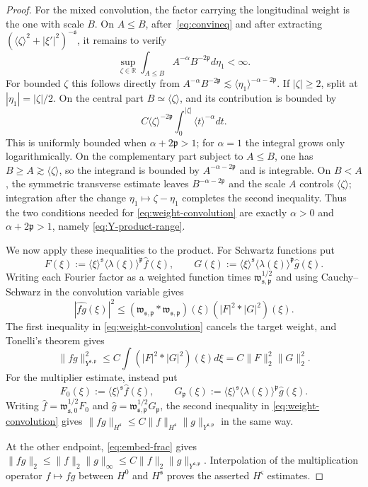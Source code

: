 \documentclass[11pt,reqno]{amsart}
\theoremstyle{plain}
\theoremstyle{definition}
\theoremstyle{remark}
\numberwithin{equation}{section}
\newcommand{\sreg}{\mathfrak s}
\newcommand{\preg}{\mathfrak p}
\newcommand{\Real}{\mathbb R}
\begin{document}
\begin{proof}
For the mixed convolution, the factor carrying the longitudinal weight is
the one with scale $B$.  On $A\le B$, after~\eqref{eq:convineq} and after extracting
$(\langle\zeta\rangle^2+|\xi'|^2)^{-\sreg}$, it remains to verify
\[
 \sup_{\zeta\in\Real}
 \int_{A\le B}A^{-\alpha}B^{-2\preg} d\eta_1<\infty.
\]
For bounded $\zeta$ this follows directly from
$A^{-\alpha}B^{-2\preg}\lesssim
\langle\eta_1\rangle^{-\alpha-2\preg}$.  If $|\zeta|\ge2$, split at
$|\eta_1|=|\zeta|/2$.  On the central part $B\simeq\langle\zeta\rangle$,
and its contribution is bounded by
\[
 C\langle\zeta\rangle^{-2\preg}
 \int_0^{|\zeta|}\langle t\rangle^{-\alpha} dt.
\]
This is uniformly bounded when $\alpha+2\preg>1$; for $\alpha=1$ the
integral grows only logarithmically.  On the complementary part subject to
$A\le B$, one has $B\ge A\gtrsim\langle\zeta\rangle$, so the integrand is
bounded by $A^{-\alpha-2\preg}$ and is integrable.  On $B<A$, the symmetric
transverse estimate leaves $B^{-\alpha-2\preg}$ and the scale $A$ controls
$\langle\zeta\rangle$; integration after the change
$\eta_1\mapsto\zeta-\eta_1$ completes the second inequality.  Thus the two
conditions needed for \eqref{eq:weight-convolution} are exactly
$\alpha>0$ and $\alpha+2\preg>1$, namely \eqref{eq:Y-product-range}.

We now apply these inequalities to the product.  For Schwartz functions put
\[
 F(\xi):=\langle\xi\rangle^{\sreg}
          \langle\lambda(\xi)\rangle^{\preg}\widehat f(\xi),
 \qquad
 G(\xi):=\langle\xi\rangle^{\sreg}
          \langle\lambda(\xi)\rangle^{\preg}\widehat g(\xi).
\]
Writing each Fourier factor as a weighted function times
$\mathfrak w_{\sreg,\preg}^{1/2}$ and using Cauchy--Schwarz in the
convolution variable gives
\[
 |\widehat{fg}(\xi)|^2
 \le
 (\mathfrak w_{\sreg,\preg}*\mathfrak w_{\sreg,\preg})(\xi)
 (|F|^2*|G|^2)(\xi).
\]
The first inequality in \eqref{eq:weight-convolution} cancels the target
weight, and Tonelli's theorem gives
\[
 \|fg\|_{Y^{\sreg,\preg}}^2
 \le C\int (|F|^2*|G|^2)(\xi) d\xi
 =C\|F\|_2^2\|G\|_2^2.
\]
For the multiplier estimate, instead put
\[
 F_0(\xi):=\langle\xi\rangle^{\sreg}\widehat f(\xi),
 \qquad
 G_{\preg}(\xi):=\langle\xi\rangle^{\sreg}
 \langle\lambda(\xi)\rangle^{\preg}\widehat g(\xi).
\]
Writing $\widehat f=\mathfrak w_{\sreg,0}^{1/2}F_0$ and
$\widehat g=\mathfrak w_{\sreg,\preg}^{1/2}G_{\preg}$, the second
inequality in \eqref{eq:weight-convolution} gives
$\|fg\|_{H^{\sreg}}\le C\|f\|_{H^{\sreg}}
\|g\|_{Y^{\sreg,\preg}}$ in the same way.

At the other endpoint, \eqref{eq:embed-frac} gives
$\|fg\|_2\le\|f\|_2\|g\|_\infty
\le C\|f\|_2\|g\|_{Y^{\sreg,\preg}}$.
Interpolation of the multiplication operator $f\mapsto fg$ between
$H^0$ and $H^{\sreg}$ proves the asserted $H^\varsigma$ estimates.  
\end{proof}
\end{document}
